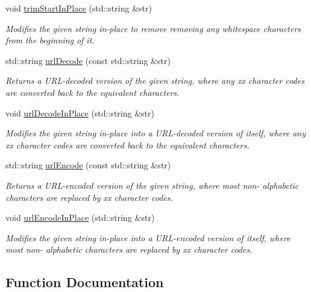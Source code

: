 \begin{DoxyCompactItemize}
void \mbox{\hyperlink{namespacesgl_1_1priv_1_1strlib_a841f8a71a4e70a1a65ebcf9ed24e3334}{trim\+Start\+In\+Place}} (std\+::string \&str)
\begin{DoxyCompactList}\small\item\em Modifies the given string in-\/place to remove removing any whitespace characters from the beginning of it. \end{DoxyCompactList}\item 
std\+::string \mbox{\hyperlink{namespacesgl_1_1priv_1_1strlib_a27232ef1c4000c2cf048d43b75d3faba}{url\+Decode}} (const std\+::string \&str)
\begin{DoxyCompactList}\small\item\em Returns a U\+R\+L-\/decoded version of the given string, where any xx character codes are converted back to the equivalent characters. \end{DoxyCompactList}\item 
void \mbox{\hyperlink{namespacesgl_1_1priv_1_1strlib_a18179778100838daa81655bf9a912e9e}{url\+Decode\+In\+Place}} (std\+::string \&str)
\begin{DoxyCompactList}\small\item\em Modifies the given string in-\/place into a U\+R\+L-\/decoded version of itself, where any xx character codes are converted back to the equivalent characters. \end{DoxyCompactList}\item 
std\+::string \mbox{\hyperlink{namespacesgl_1_1priv_1_1strlib_aee15f17b2470cc3e874de693b091e702}{url\+Encode}} (const std\+::string \&str)
\begin{DoxyCompactList}\small\item\em Returns a U\+R\+L-\/encoded version of the given string, where most non-\/ alphabetic characters are replaced by xx character codes. \end{DoxyCompactList}\item 
void \mbox{\hyperlink{namespacesgl_1_1priv_1_1strlib_a0d795c9b0ee3f6a80517e290da8f16d4}{url\+Encode\+In\+Place}} (std\+::string \&str)
\begin{DoxyCompactList}\small\item\em Modifies the given string in-\/place into a U\+R\+L-\/encoded version of itself, where most non-\/ alphabetic characters are replaced by xx character codes. \end{DoxyCompactList}\end{DoxyCompactItemize}


\subsection{Function Documentation}
\mbox{\label{namespacesgl_1_1priv_1_1strlib_a16b65d62216f8caae8d5827707e64435}} 

